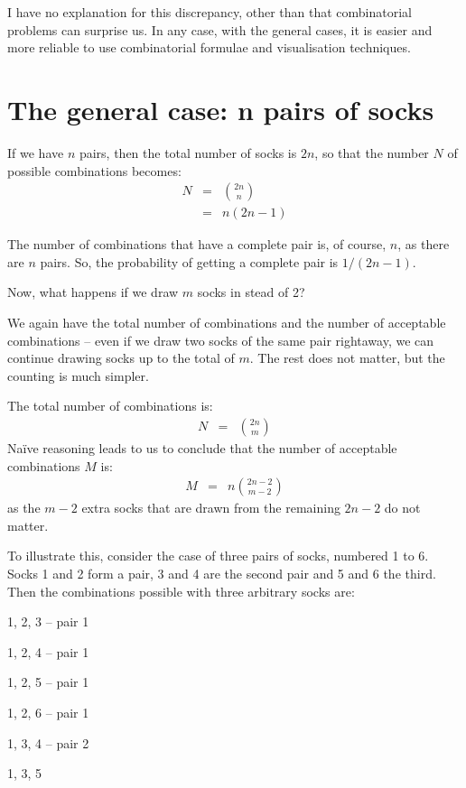 \documentclass[onecolumn]{article}
\begin{document}
I have no explanation for this discrepancy, other than that combinatorial problems
can surprise us. In any case, with the general cases, it is easier and more reliable
to use combinatorial formulae and visualisation techniques.

\section*{The general case: n pairs of socks}
If we have $n$ pairs, then the total number of socks is $2n$, so that the number $N$ of
possible combinations becomes:
%
\begin{eqnarray}
\nonumber N &=& \binom{2n}{n} \\
\nonumber   &=& n(2n-1)
\end{eqnarray}

The number of combinations that have a complete pair is, of course, $n$, as there
are $n$ pairs. So, the probability of getting a complete pair is $1/(2n-1)$.

Now, what happens if we draw $m$ socks in stead of 2?

We again have the total number of combinations and the number of acceptable
combinations -- even if we draw two socks of the same pair rightaway, we can continue
drawing socks up to the total of $m$. The rest does not matter, but the counting
is much simpler.

The total number of combinations is:
%
\begin{eqnarray}
\nonumber N &=& \binom{2n}{m}
\end{eqnarray}
%
Na\"ive reasoning leads to us to conclude that the number of acceptable combinations $M$ is:
\begin{eqnarray}
\nonumber M &=& n \binom{2n-2}{m-2}
\end{eqnarray}
%
\noindent as the $m-2$ extra socks that are drawn from the remaining $2n-2$ do not matter.

To illustrate this, consider the case of three pairs of socks, numbered 1 to 6. Socks 1 and 2
form a pair, 3 and 4 are the second pair and 5 and 6 the third. Then the combinations
possible with three arbitrary socks are:

1, 2, 3 -- pair 1

1, 2, 4 -- pair 1

1, 2, 5 -- pair 1

1, 2, 6 -- pair 1

1, 3, 4 -- pair 2

1, 3, 5
\end{document}
